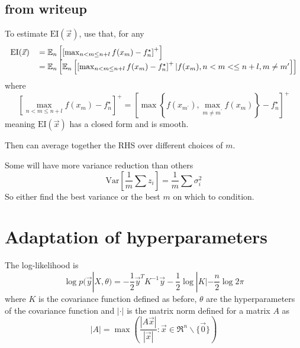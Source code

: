 \documentclass[phd,tocprelim]{cornell}
\begin{document}
\subsection{from writeup}

To estimate $\mbox{EI}(\vec{x})$, use that, for any
\begin{equation}
 \begin{tabular}{rl} $\mbox{EI}(\vec{x})$ & $= \mathbb{E}_{n} \left[ \left[ \max_{n < m \leq n+l} f(x_{m}) - f_{n}^{\star} \right]^{+} \right]$ \\
  & $= \mathbb{E}_{n} \left[ \mathbb{E}_{n} \left[ \left[ \max_{n < m \leq n + l} f(x_{m}) - f^{\star}_{n} \right]^{+} | f(x_{m}), n < m < \leq n + l, m \neq m^{\prime} \right] \right]$ \end{tabular}
\end{equation}
where
\begin{equation}
 \left[ \max_{n < m \leq n + l} f(x_{m}) - f^{\star}_{n} \right]^{+} = \left[ \max \left\{ f(x_{m^{\prime}}), \max_{m \neq m^{\prime}} f(x_{m}) \right\} - f_{n}^{\star} \right]^{+}
\end{equation}
meaning $\mbox{EI}(\vec{x})$ has a closed form and is smooth.

Then can average together the RHS over different choices of $m$.

Some will have more variance reduction than others
\begin{equation}
 \mbox{Var}\left[\frac{1}{m} \sum z_{i}\right] = \frac{1}{m} \sum \sigma_{i}^{2}
\end{equation}
So either find the best variance or the best $m$ on which to condition.


\section{Adaptation of hyperparameters} %
\label{sec:Adaptation of hyperparameters}

\cite{RW}
The log-likelihood is
\begin{equation}
    \log p(\vec{y}|X, \theta) = -\frac{1}{2}\vec{y}^{T}K^{-1}\vec{y} - \frac{1}{2}\log|K| - \frac{n}{2} \log 2\pi
\end{equation}
where $K$ is the covariance function defined as before, $\theta$ are the hyperparameters of the covariance function and $|\cdot|$ is the matrix norm defined for a matrix $A$ as
\begin{equation}
    |A| = \max \left( \frac{|A\vec{x}|}{|\vec{x}|} : \vec{x} \in \Re^{n}\backslash\{\vec{0}\} \right)
\end{equation}
\end{document}
